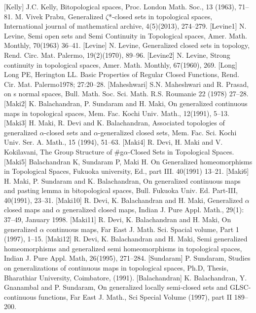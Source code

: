 \begin{thebibliography}{99}
 [Kelly] J.C. Kelly, Bitopological spaces, Proc. London Math. Soc., 13 (1963), 71--81.
 M. Vivek Prabu, Generalized $\zeta$*-closed sets in topological spaces, International journal of mathematical archive, 4(5)(2013), 274--279.
 [Levine1] N. Levine, Semi open sets and Semi Continuity in Topological spaces, Amer. Math. Monthly, 70(1963) 36--41.
 [Levine] N. Levine, Generalized closed sets in topology, Rend. Circ. Mat. Palermo,  19(2)(1970), 89--96.
 [Levine2] N. Levine, Strong continuity in topological spaces, Amer. Math. Monthly, 67(1960), 269.
 [Long] Long PE, Herington LL. Basic Properties of Regular Closed Functions, Rend. Cir. Mat. Palermo1978; 27:20--28. 
 [Maheshwari] S.N. Maheshwari and R. Prasad, on s normal spaces, Bull. Math. Soc. Sci. Math. R.S. Roumanie 22 (1978) 27--28.
 [Maki2] K. Balachandran, P. Sundaram and H. Maki, On generalized continuous maps in topological spaces, Mem. Fac. Kochi Univ. Math., 12(1991), 5--13. 
 [Maki3] H. Maki, R. Devi and K. Balachandran, Associated topologies of generalized $\alpha$-closed sets and $\alpha$-generalized closed sets, Mem. Fac. Sci. Kochi Univ. Ser. A. Math., 15 (1994), 51--63.
 [Maki4] R. Devi, H. Maki and V. Kokilavani, The Group Structure of \#g$\alpha$-Closed Sets in Topological Spaces.
 [Maki5] Balachandran K, Sundaram P, Maki H. On Generalized homeomorphisms in Topological Spaces, Fukuoka university, Ed., part III. 40(1991) 13--21.
 [Maki6] H. Maki, P. Sundaram and K. Balachandran, On generalized continuous maps and pasting lemma in bitopological spaces, Bull. Fukuoka Univ. Ed. Part-III, 40(1991), 23--31.
 [Maki10] R. Devi, K. Balachandran and H. Maki, Generalized $\alpha$ closed maps and $\alpha$ generalized closed maps, Indian J. Pure Appl. Math., 29(1): 37--49, January 1998.
 [Maki11] R. Devi, K. Balachandran and H. Maki, On generalized $\alpha$ continuous maps, Far East J. Math. Sci. Spacial volume, Part 1 (1997), 1--15.
 [Maki12] R. Devi, K. Balachandran and H. Maki, Semi generalized homeomorphisms and generalized semi homeomorphisms in topological spaces, Indian J. Pure Appl. Math, 26(1995), 271--284.
 [Sundaram] P. Sundaram, Studies on generalizations of continuous maps in topological spaces, Ph.D, Thesis, Bharathiar University, Coimbatore, (1991).
 [Balachandran] K. Balachandran, Y. Gnanambal and P. Sundaram, On generalized locally semi-closed sets and GLSC-continuous functions, Far East J. Math., Sci Special Volume (1997), part II 189--200.

\end{thebibliography}
